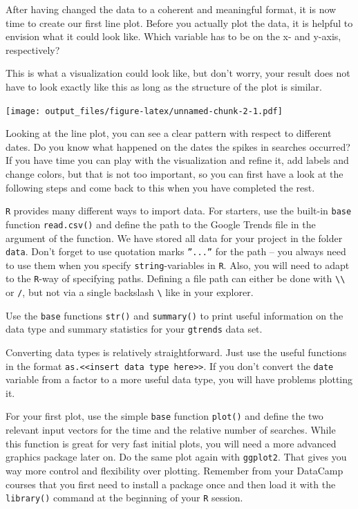 \documentclass[
  11pt,
]{article}
\newenvironment{tips}[1]
  {
  \begin{itemize}
  \footnotesize
  \renewcommand{\labelitemi}{
    \raisebox{-.7\height}[0pt][0pt]{
      {\setkeys{Gin}{width=3em,keepaspectratio}
        \texttt{[image: images/\#1.png]}}
    }
  }
  \setlength{\fboxsep}{1em}
  \begin{rbox}
  \item
  }
  {
  \end{rbox}
  \end{itemize}
  }
\begin{document}
After having changed the data to a coherent and meaningful format, it is now time to create our first line plot. Before you actually plot the data, it is helpful to envision what it could look like. Which variable has to be on the x- and y-axis, respectively?

This is what a visualization could look like, but don't worry, your result does not have to look exactly like this as long as the structure of the plot is similar.

\texttt{[image: output\_files/figure-latex/unnamed-chunk-2-1.pdf]}

Looking at the line plot, you can see a clear pattern with respect to different dates. Do you know what happened on the dates the spikes in searches occurred? If you have time you can play with the visualization and refine it, add labels and change colors, but that is not too important, so you can first have a look at the following steps and come back to this when you have completed the rest.

\begin{tips}r

\texttt{R} provides many different ways to import data. For starters, use the built-in \texttt{base} function \texttt{read.csv()} and define the path to the Google Trends file in the argument of the function. We have stored all data for your project in the folder \texttt{data}. Don't forget to use quotation marks \texttt{”...”} for the path -- you always need to use them when you specify \texttt{string}-variables in \texttt{R}. Also, you will need to adapt to the \texttt{R}-way of specifying paths. Defining a file path can either be done with \texttt{\textbackslash{}\textbackslash{}} or \texttt{/}, but not via a single backslash \texttt{\textbackslash{}} like in your explorer.

Use the \texttt{base} functions \texttt{str()} and \texttt{summary()} to print useful information on the data type and summary statistics for your \texttt{gtrends} data set.

Converting data types is relatively straightforward. Just use the useful functions in the format \texttt{as.\textless{}\textless{}insert\ data\ type\ here\textgreater{}\textgreater{}}. If you don't convert the \texttt{date} variable from a factor to a more useful data type, you will have problems plotting it.

For your first plot, use the simple \texttt{base} function \texttt{plot()} and define the two relevant input vectors for the time and the relative number of searches. While this function is great for very fast initial plots, you will need a more advanced graphics package later on. Do the same plot again with \texttt{ggplot2}. That gives you way more control and flexibility over plotting. Remember from your DataCamp courses that you first need to install a package once and then load it with the \texttt{library()} command at the beginning of your \texttt{R} session.

\end{tips}
\end{document}
